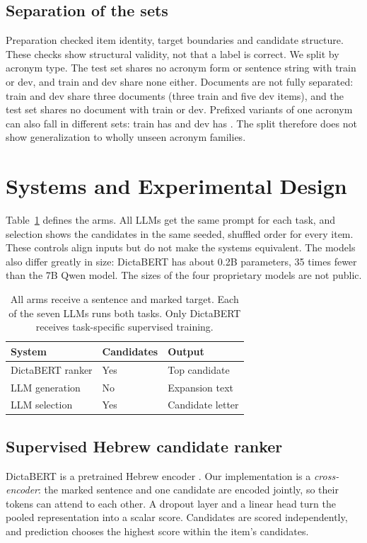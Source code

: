\documentclass[11pt]{article}
\newcommand{\heb}[1]{\R{#1}}
\begin{document}
\subsection{Separation of the sets}
\label{sec:separation}
Preparation checked item identity, target boundaries and candidate structure. These checks show structural validity, not that a label is correct. We split by acronym type. The test set shares no acronym form or sentence string with train or dev, and train and dev share none either. Documents are not fully separated: train and dev share three documents (three train and five dev items), and the test set shares no document with train or dev. Prefixed variants of one acronym can also fall in different sets: train has \heb{מד״ר} and dev has \heb{בד״ר}. The split therefore does not show generalization to wholly unseen acronym families.

\section{Systems and Experimental Design}
\label{sec:systems}
Table~\ref{tab:systems} defines the arms. All LLMs get the same prompt for each task, and selection shows the candidates in the same seeded, shuffled order for every item. These controls align inputs but do not make the systems equivalent. The models also differ greatly in size: DictaBERT has about 0.2B parameters, 35 times fewer than the 7B Qwen model. The sizes of the four proprietary models are not public.

\begin{table}[t]
\centering\small
\begin{tabular}{@{}lll@{}}
\toprule
System & Candidates & Output \\
\midrule
DictaBERT ranker & Yes & Top candidate \\
LLM generation & No & Expansion text \\
LLM selection & Yes & Candidate letter \\
\bottomrule
\end{tabular}
\caption{All arms receive a sentence and marked target. Each of the seven LLMs runs both tasks. Only DictaBERT receives task-specific supervised training.}
\label{tab:systems}
\end{table}

\subsection{Supervised Hebrew candidate ranker}
DictaBERT is a pretrained Hebrew encoder \citep{shmidman2023dictabert}. Our implementation is a \emph{cross-encoder}: the marked sentence and one candidate are encoded jointly, so their tokens can attend to each other. A dropout layer and a linear head turn the pooled representation into a scalar score. Candidates are scored independently, and prediction chooses the highest score within the item's candidates.
\end{document}
